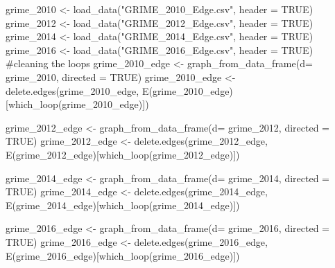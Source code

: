 \documentclass[
  letterpaper,
  DIV=11,
  numbers=noendperiod]{scrreprt}
\newenvironment{Shaded}{\begin{snugshade}}{\end{snugshade}}
\newcommand{\AttributeTok}[1]{\textcolor[rgb]{0.40,0.45,0.13}{#1}}
\newcommand{\CommentTok}[1]{\textcolor[rgb]{0.37,0.37,0.37}{#1}}
\newcommand{\ConstantTok}[1]{\textcolor[rgb]{0.56,0.35,0.01}{#1}}
\newcommand{\FunctionTok}[1]{\textcolor[rgb]{0.28,0.35,0.67}{#1}}
\newcommand{\NormalTok}[1]{\textcolor[rgb]{0.00,0.23,0.31}{#1}}
\newcommand{\OtherTok}[1]{\textcolor[rgb]{0.00,0.23,0.31}{#1}}
\newcommand{\StringTok}[1]{\textcolor[rgb]{0.13,0.47,0.30}{#1}}
\begin{document}
\begin{Shaded}
\begin{Highlighting}[]
\NormalTok{grime\_2010 }\OtherTok{\textless{}{-}} \FunctionTok{load\_data}\NormalTok{(}\StringTok{"GRIME\_2010\_Edge.csv"}\NormalTok{, }\AttributeTok{header =} \ConstantTok{TRUE}\NormalTok{)}
\NormalTok{grime\_2012 }\OtherTok{\textless{}{-}} \FunctionTok{load\_data}\NormalTok{(}\StringTok{"GRIME\_2012\_Edge.csv"}\NormalTok{, }\AttributeTok{header =} \ConstantTok{TRUE}\NormalTok{)}
\NormalTok{grime\_2014 }\OtherTok{\textless{}{-}} \FunctionTok{load\_data}\NormalTok{(}\StringTok{"GRIME\_2014\_Edge.csv"}\NormalTok{, }\AttributeTok{header =} \ConstantTok{TRUE}\NormalTok{)}
\NormalTok{grime\_2016 }\OtherTok{\textless{}{-}} \FunctionTok{load\_data}\NormalTok{(}\StringTok{"GRIME\_2016\_Edge.csv"}\NormalTok{, }\AttributeTok{header =} \ConstantTok{TRUE}\NormalTok{)}
\CommentTok{\#cleaning the loops}
\NormalTok{grime\_2010\_edge }\OtherTok{\textless{}{-}} \FunctionTok{graph\_from\_data\_frame}\NormalTok{(}\AttributeTok{d=}\NormalTok{ grime\_2010, }\AttributeTok{directed =} \ConstantTok{TRUE}\NormalTok{)}
\NormalTok{grime\_2010\_edge }\OtherTok{\textless{}{-}} \FunctionTok{delete.edges}\NormalTok{(grime\_2010\_edge, }\FunctionTok{E}\NormalTok{(grime\_2010\_edge)[}\FunctionTok{which\_loop}\NormalTok{(grime\_2010\_edge)])}

\NormalTok{grime\_2012\_edge }\OtherTok{\textless{}{-}} \FunctionTok{graph\_from\_data\_frame}\NormalTok{(}\AttributeTok{d=}\NormalTok{ grime\_2012, }\AttributeTok{directed =} \ConstantTok{TRUE}\NormalTok{)}
\NormalTok{grime\_2012\_edge }\OtherTok{\textless{}{-}} \FunctionTok{delete.edges}\NormalTok{(grime\_2012\_edge, }\FunctionTok{E}\NormalTok{(grime\_2012\_edge)[}\FunctionTok{which\_loop}\NormalTok{(grime\_2012\_edge)])}

\NormalTok{grime\_2014\_edge }\OtherTok{\textless{}{-}} \FunctionTok{graph\_from\_data\_frame}\NormalTok{(}\AttributeTok{d=}\NormalTok{ grime\_2014, }\AttributeTok{directed =} \ConstantTok{TRUE}\NormalTok{)}
\NormalTok{grime\_2014\_edge }\OtherTok{\textless{}{-}} \FunctionTok{delete.edges}\NormalTok{(grime\_2014\_edge, }\FunctionTok{E}\NormalTok{(grime\_2014\_edge)[}\FunctionTok{which\_loop}\NormalTok{(grime\_2014\_edge)])}

\NormalTok{grime\_2016\_edge }\OtherTok{\textless{}{-}} \FunctionTok{graph\_from\_data\_frame}\NormalTok{(}\AttributeTok{d=}\NormalTok{ grime\_2016, }\AttributeTok{directed =} \ConstantTok{TRUE}\NormalTok{)}
\NormalTok{grime\_2016\_edge }\OtherTok{\textless{}{-}} \FunctionTok{delete.edges}\NormalTok{(grime\_2016\_edge, }\FunctionTok{E}\NormalTok{(grime\_2016\_edge)[}\FunctionTok{which\_loop}\NormalTok{(grime\_2016\_edge)])}
\end{Highlighting}
\end{Shaded}
\end{document}
